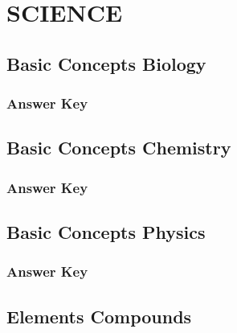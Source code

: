 \documentclass[12pt,a4paper]{book}
\newcounter{totalcounter}
\begin{document}
\frontmatter

\tableofcontents

\mainmatter

\chapter{SCIENCE}

\setcounter{totalcounter}{1}

\section{Basic Concepts Biology}



\subsection*{Answer Key}



\setcounter{totalcounter}{1}

\section{Basic Concepts Chemistry}



\subsection*{Answer Key}



\setcounter{totalcounter}{1}

\section{Basic Concepts Physics}



\subsection*{Answer Key}



\setcounter{totalcounter}{1}

\section{Elements Compounds}
\end{document}
